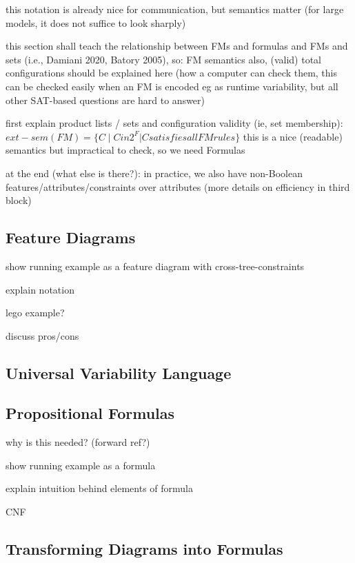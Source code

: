this notation is already nice for communication, but semantics matter (for large models, it does not suffice to look sharply)

this section shall teach the relationship between FMs and formulas and FMs and sets (i.e., Damiani 2020, Batory 2005), so: FM semantics
also, (valid) total configurations should be explained here (how a computer can check them, this can be checked easily when an FM is encoded eg as runtime variability, but all other SAT-based questions are hard to answer)

first explain product lists / sets and configuration validity (ie, set membership):
$ext-sem (FM) = \{ C \mid C in 2^F | C satisfies all FM rules \}$
this is a nice (readable) semantics but impractical to check, so we need Formulas


at the end (what else is there?): in practice, we also have non-Boolean features/attributes/constraints over attributes (more details on efficiency in third block)





\subsection{Feature Diagrams}

show running example as a feature diagram with cross-tree-constraints

explain notation

lego example?

discuss pros/cons

\subsection{Universal Variability Language}

\subsection{Propositional Formulas}

why is this needed? (forward ref?)

show running example as a formula

explain intuition behind elements of formula

CNF

\subsection{Transforming Diagrams into Formulas}

